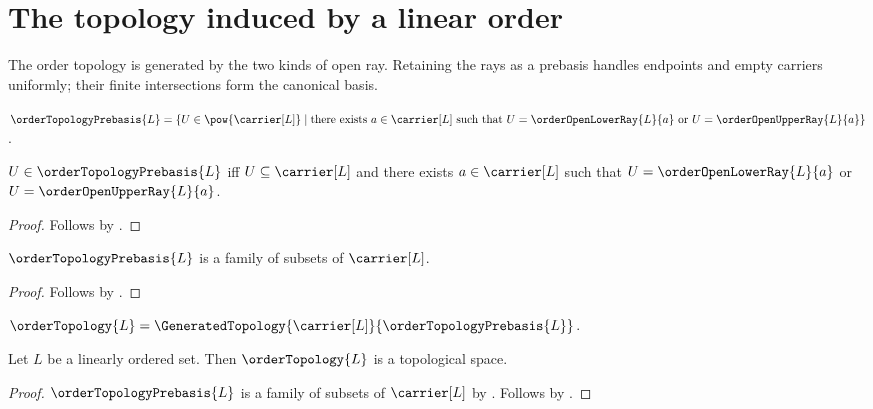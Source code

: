 \section{The topology induced by a linear order}




The order topology is generated by the two kinds of open ray.  Retaining the
rays as a prebasis handles endpoints and empty carriers uniformly; their
finite intersections form the canonical basis.

\begin{definition}\label{order_topology_prebasis}
    $\orderTopologyPrebasis{L}
        =\{U\in\pow{\carrier[L]}\mid
            \text{there exists $a\in\carrier[L]$ such that
                $U=\orderOpenLowerRay{L}{a}$ or
                $U=\orderOpenUpperRay{L}{a}$}\}$.
\end{definition}

\begin{proposition}\label{order_topology_prebasis_iff}
    $U\in\orderTopologyPrebasis{L}$ iff
        $U\subseteq\carrier[L]$ and there exists $a\in\carrier[L]$
        such that $U=\orderOpenLowerRay{L}{a}$ or
        $U=\orderOpenUpperRay{L}{a}$.
\end{proposition}
\begin{proof}
    Follows by
        .
\end{proof}

\begin{proposition}\label{order_topology_prebasis_type}
    $\orderTopologyPrebasis{L}$ is a family of subsets of $\carrier[L]$.
\end{proposition}
\begin{proof}
    Follows by .
\end{proof}

\begin{definition}\label{order_topology}
    $\orderTopology{L}
        =\GeneratedTopology{\carrier[L]}{\orderTopologyPrebasis{L}}$.
\end{definition}

\begin{classification}\label{order_topology_is_topological_space}
    Let $L$ be a linearly ordered set.
    Then $\orderTopology{L}$ is a topological space.
\end{classification}
\begin{proof}
    $\orderTopologyPrebasis{L}$ is a family of subsets of $\carrier[L]$
        by .
    Follows by
        .
\end{proof}

